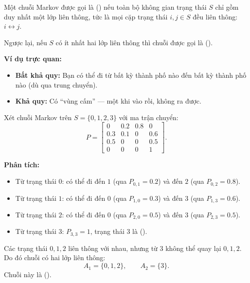 \begin{dinhnghia}
\label{def:irreducible}
Một chuỗi Markov được gọi là  () nếu toàn bộ không gian
trạng thái $S$ chỉ gồm duy nhất một lớp liên thông, tức là mọi cặp trạng thái $i, j \in S$
đều liên thông: $i \leftrightarrow j$.

Ngược lại, nếu $S$ có ít nhất hai lớp liên thông thì chuỗi được gọi là
 ().
\end{dinhnghia}

\textbf{Ví dụ trực quan:}
\begin{itemize}[nosep]
  \item \textbf{Bất khả quy:} Bạn có thể đi từ bất kỳ thành phố nào đến bất kỳ thành phố nào (dù qua trung chuyển).
  \item \textbf{Khả quy:} Có ``vùng cấm'' --- một khi vào rồi, không ra được.
\end{itemize}

\begin{example}
\label{ex:reducible-chain}
Xét chuỗi Markov trên $S = \{0, 1, 2, 3\}$ với ma trận chuyển:
\begin{equation}\label{eq:reducible-matrix}
  P = \begin{bmatrix}
    0   & 0.2 & 0.8 & 0   \\
    0.3 & 0.1 & 0   & 0.6 \\
    0.5 & 0   & 0   & 0.5 \\
    0   & 0   & 0   & 1
  \end{bmatrix}.
\end{equation}

\textbf{Phân tích:}
\begin{itemize}[nosep]
  \item Từ trạng thái $0$: có thể đi đến $1$ (qua $P_{0,1} = 0.2$) và đến $2$ (qua $P_{0,2} = 0.8$).
  \item Từ trạng thái $1$: có thể đi đến $0$ (qua $P_{1,0} = 0.3$) và đến $3$ (qua $P_{1,3} = 0.6$).
  \item Từ trạng thái $2$: có thể đi đến $0$ (qua $P_{2,0} = 0.5$) và đến $3$ (qua $P_{2,3} = 0.5$).
  \item Từ trạng thái $3$: $P_{3,3} = 1$, trạng thái $3$ là  ().
\end{itemize}

Các trạng thái $0, 1, 2$ liên thông với nhau, nhưng từ $3$ không thể quay lại $0, 1, 2$.
Do đó chuỗi có hai lớp liên thông:
\[
  A_1 = \{0, 1, 2\}, \qquad A_2 = \{3\}.
\]
Chuỗi này là  ().
\end{example}

